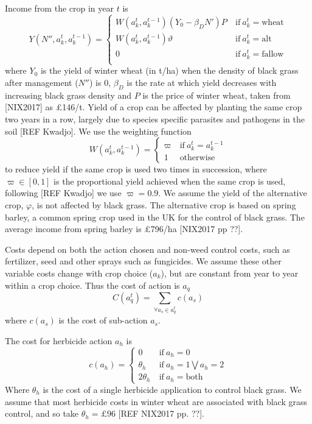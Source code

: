 \documentclass[12pt, a4paper]{article}
\begin{document}
Income from the crop in year $t$ is    
\begin{equation}\label{eq:yield}
	Y(N'', a_k^t, a_k^{t-1}) = \begin{cases} 
		W(a_k^t, a_k^{t-1})(Y_0 - \beta_D N')P &~\text{if}~a_k^t = \text{wheat}\\
		W(a_k^t, a_k^{t-1})\vartheta &~\text{if}~a_k^t = \text{alt}\\
		0 &~\text{if}~a_k^t = \text{fallow}\\
	\end{cases}
\end{equation}   
where $Y_0$ is the yield of winter wheat (in t/ha) when the density of black grass after management ($N''$) is 0, $\beta_D$ is the rate at which yield decreases with increasing black grass density and $P$ is the price of winter wheat, taken from [NIX2017] as £146/t. Yield of a crop can be affected by planting the same crop two years in a row, largely due to species specific parasites and pathogens in the soil [REF Kwadjo]. We use the weighting function 
\begin{equation}
	W(a_k^t, a_k^{t-1}) = \begin{cases}
		\varpi &~\text{if}~a_k^t = a_k^{t-1}\\
		1 &~\text{otherwise}
	\end{cases}
\end{equation} 
to reduce yield if the same crop is used two times in succession, where $\varpi \in [0, 1]$ is the proportional yield achieved when the same crop is used, following [REF Kwadjo] we use $\varpi = 0.9$. We assume the yield of the alternative crop, $\varphi$, is not affected by black grass. The alternative crop is based on spring barley, a common spring crop used in the UK for the control of black grass. The average income from spring barley is \pounds 796/ha [NIX2017 pp ??].   

Costs depend on both the action chosen and non-weed control costs, such as fertilizer, seed and other sprays such as fungicides. We assume these other variable costs change with crop choice ($a_k$), but are constant from year to year within a crop choice. Thus the cost of action is $a_q$  
\begin{equation}
	C(a_q^t) = \sum_{\forall a_s \in a_q^t} c(a_s)
\end{equation}
where $c(a_s)$ is the cost of sub-action $a_s$. 

The cost for herbicide action $a_h$ is  
\begin{equation}\label{eq:herb_cost}
	c(a_h) = \begin{cases}
		0~&\text{if}~a_h = 0\\
		\theta_h~&\text{if}~a_h = 1 \bigvee a_h = 2 \\
		2\theta_h~&\text{if}~a_h = \text{both}
	\end{cases}
\end{equation}
Where $\theta_h$ is the cost of a single herbicide application to control black grass. We assume that most herbicide costs in winter wheat are associated with black grass control, and so take $\theta_h = \pounds 96$ [REF NIX2017 pp. ??]. 
\end{document}
